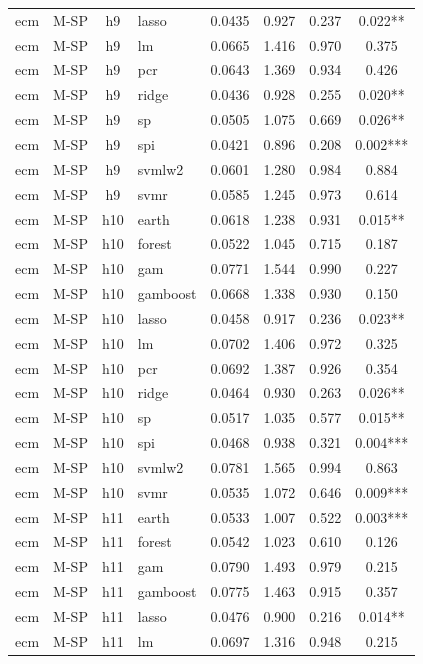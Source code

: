 \begin{ThreePartTable}
\begin{longtable}[t]{llclcccc}
ecm & M-SP & h9 & lasso & 0.0435 & 0.927 & 0.237 & 0.022**\\
ecm & M-SP & h9 & lm & 0.0665 & 1.416 & 0.970 & 0.375\\
ecm & M-SP & h9 & pcr & 0.0643 & 1.369 & 0.934 & 0.426\\
ecm & M-SP & h9 & ridge & 0.0436 & 0.928 & 0.255 & 0.020**\\
ecm & M-SP & h9 & sp & 0.0505 & 1.075 & 0.669 & 0.026**\\
ecm & M-SP & h9 & spi & 0.0421 & 0.896 & 0.208 & 0.002***\\
ecm & M-SP & h9 & svmlw2 & 0.0601 & 1.280 & 0.984 & 0.884\\
ecm & M-SP & h9 & svmr & 0.0585 & 1.245 & 0.973 & 0.614\\
\addlinespace
ecm & M-SP & h10 & earth & 0.0618 & 1.238 & 0.931 & 0.015**\\
ecm & M-SP & h10 & forest & 0.0522 & 1.045 & 0.715 & 0.187\\
ecm & M-SP & h10 & gam & 0.0771 & 1.544 & 0.990 & 0.227\\
ecm & M-SP & h10 & gamboost & 0.0668 & 1.338 & 0.930 & 0.150\\
ecm & M-SP & h10 & lasso & 0.0458 & 0.917 & 0.236 & 0.023**\\
ecm & M-SP & h10 & lm & 0.0702 & 1.406 & 0.972 & 0.325\\
ecm & M-SP & h10 & pcr & 0.0692 & 1.387 & 0.926 & 0.354\\
ecm & M-SP & h10 & ridge & 0.0464 & 0.930 & 0.263 & 0.026**\\
ecm & M-SP & h10 & sp & 0.0517 & 1.035 & 0.577 & 0.015**\\
ecm & M-SP & h10 & spi & 0.0468 & 0.938 & 0.321 & 0.004***\\
ecm & M-SP & h10 & svmlw2 & 0.0781 & 1.565 & 0.994 & 0.863\\
ecm & M-SP & h10 & svmr & 0.0535 & 1.072 & 0.646 & 0.009***\\
\addlinespace
ecm & M-SP & h11 & earth & 0.0533 & 1.007 & 0.522 & 0.003***\\
ecm & M-SP & h11 & forest & 0.0542 & 1.023 & 0.610 & 0.126\\
ecm & M-SP & h11 & gam & 0.0790 & 1.493 & 0.979 & 0.215\\
ecm & M-SP & h11 & gamboost & 0.0775 & 1.463 & 0.915 & 0.357\\
ecm & M-SP & h11 & lasso & 0.0476 & 0.900 & 0.216 & 0.014**\\
ecm & M-SP & h11 & lm & 0.0697 & 1.316 & 0.948 & 0.215\\

\end{longtable}
\end{ThreePartTable}
